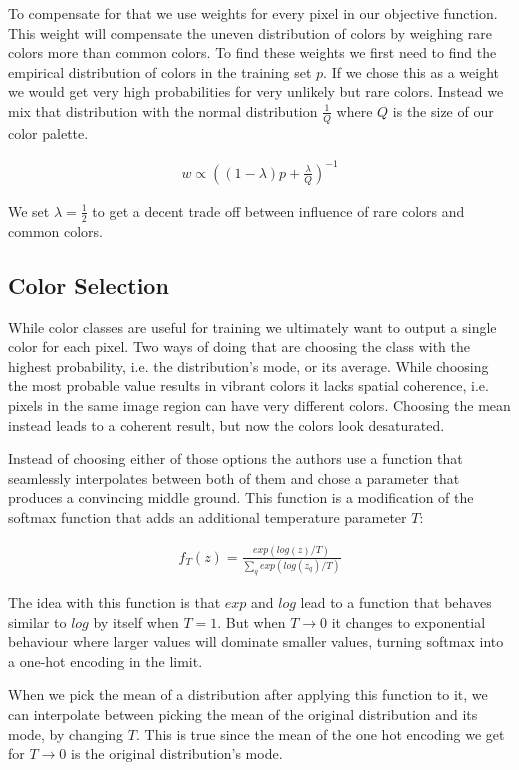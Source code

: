 \documentclass[11pt]{article}
\begin{document}
To compensate for that we use weights for every pixel in our objective function. This weight will compensate the uneven distribution of colors by weighing rare colors more than common colors. To find these weights we first need to find the empirical distribution of colors in the training set $p$. If we chose this as a weight we would get very high probabilities for very unlikely but rare colors. Instead we mix that distribution with the normal distribution $\frac{1}{Q}$ where $Q$ is the size of our color palette.

\begin{align}
    w \propto \left(\left( 1-\lambda \right) p + \frac{\lambda}{Q} \right)^{-1}
\end{align}

We set $\lambda=\frac{1}{2}$ to get a decent trade off between influence of rare colors and common colors.

\subsection{Color Selection}
\label{chap:selection}
While color classes are useful for training we ultimately want to output a single color for each pixel. Two ways of doing that are choosing the class with the highest probability, i.e. the distribution's mode, or its average. While choosing the most probable value results in vibrant colors it lacks spatial coherence, i.e. pixels in the same image region can have very different colors. Choosing the mean instead leads to a coherent result, but now the colors look desaturated.  

Instead of choosing either of those options the authors use a function that seamlessly interpolates between both of them and chose a parameter that produces a convincing middle ground. This function is a modification of the softmax function that adds an additional temperature parameter $T$:

\begin{align} \label{eq:softmax}
    f_T(z) = \frac{exp(log(z)/T)}{\sum_q{exp(log(z_q)/T)}}
\end{align}

The idea with this function is that $exp$ and $log$ lead to a function that behaves similar to $log$ by itself when $T=1$. But when $T \rightarrow 0$ it changes to exponential behaviour where larger values will dominate smaller values, turning softmax into a one-hot encoding in the limit.

When we pick the mean of a distribution after applying this function to it, we can interpolate between picking the mean of the original distribution and its mode, by changing $T$. This is true since the mean of the one hot encoding we get for $T \rightarrow 0$ is the original distribution's mode.
\end{document}
